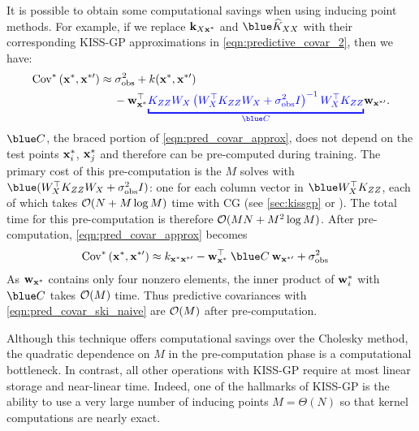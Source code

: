 It is possible to obtain some computational savings when using inducing point methods.
For example, if we replace $\mathbf{k}_{X \mathbf{x}^*}$ and $\blue \trainK$ with their corresponding KISS-GP approximations in \cref{eqn:predictive_covar_2}, then we have:
%
\begin{align}
  \covtest{\bxtest}{\bxtestprime}
  &\approx
  \sigma^2_\text{obs} + k(\bxtest, \bxtestprime)
  \nonumber \\
  &\phantom{\approx} \:\: - \bw_{\bxtest}^{\top} {\color{blue}\underbracket{{\bK_{\bZ\bZ} \bW_{\bX} \left( \bW^\top_{\bX} \bK_{\bZ\bZ} \bW_\bX + \sigma^2_\text{obs} \bI \right)^{-1} \bW^\top_{\bX} \bK_{\bZ \bZ}}}_{\blue \bC}} \bw_{\bxtestprime}.
  \label{eqn:pred_covar_approx}
\end{align}
%
$\blue \bC$, the braced portion of \cref{eqn:pred_covar_approx}, does not depend on the test points $\mathbf{x}^*_{i}$, $\mathbf{x}^*_{j}$ and therefore can be pre-computed during training.
The primary cost of this pre-computation is the $M$ solves with $\blue (\bW_\bX^\top {\bK}_{\bZ\bZ} \bW_\bX + \sigma_\text{obs}^2 \bI)$: one for each column vector in $\blue \bW^{\top}_{\bX} \bK_{\bZ\bZ}$, each of which takes $\bigo{N + M\log M}$ time with CG (see \cref{sec:kissgp} or \citet{wilson2015kernel}).
The total time for this pre-computation is therefore $\bigo{MN + M^2 \log M}$.
After pre-computation, \cref{eqn:pred_covar_approx} becomes
%
\begin{align}
  \covtest{\bxtest}{\bxtestprime} &\approx k_{\bxtest \bxtestprime} - \bw_{\bxtest}^\top \: {\blue \bC} \: \bw_{\bxtestprime} + \sigma^2_\text{obs}
    \label{eqn:pred_covar_ski_naive}
\end{align}
As $\mathbf{w}_{\mathbf{x}^*}$ contains only four nonzero elements, the inner product of $\mathbf{w}^{*}_{i}$ with $\blue \bC$ takes $\bigo{M}$ time.
Thus predictive covariances with \cref{eqn:pred_covar_ski_naive} are $\bigo{M}$ after pre-computation.

Although this technique offers computational savings over the Cholesky method, the quadratic dependence on $M$ in the pre-computation phase is a computational bottleneck.
In contrast, all other operations with KISS-GP require at most linear storage and near-linear time.
Indeed, one of the hallmarks of KISS-GP is the ability to use a very large number of inducing points $M = \Theta(N)$ so that kernel computations are nearly exact.

